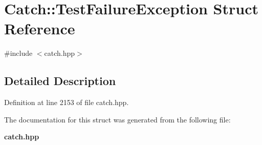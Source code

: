\section{Catch\+::Test\+Failure\+Exception Struct Reference}
\label{struct_catch_1_1_test_failure_exception}


{\ttfamily \#include $<$catch.\+hpp$>$}



\subsection{Detailed Description}


Definition at line 2153 of file catch.\+hpp.



The documentation for this struct was generated from the following file\+:\begin{DoxyCompactItemize}
\item 
\textbf{ catch.\+hpp}\end{DoxyCompactItemize}
